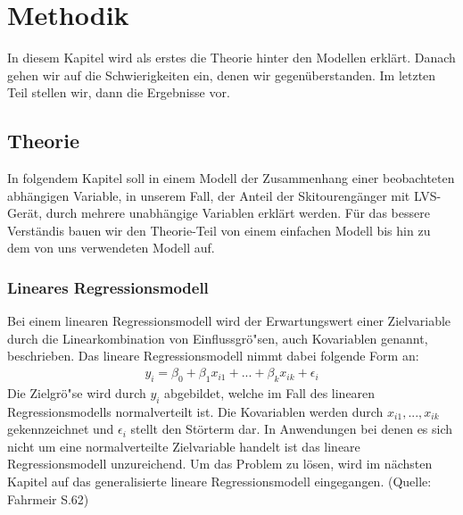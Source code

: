 \chapter{Methodik}
In diesem Kapitel wird als erstes die Theorie hinter den Modellen erklärt. Danach gehen wir auf die Schwierigkeiten ein, denen wir gegenüberstanden. Im letzten Teil stellen wir, dann die Ergebnisse vor.
\section{Theorie}
In folgendem Kapitel soll in einem Modell der Zusammenhang einer beobachteten abhängigen Variable, in unserem Fall, der Anteil der Skitourengänger mit LVS-Gerät, durch mehrere unabhängige Variablen erklärt werden.
Für das bessere Verständis bauen wir den Theorie-Teil von einem einfachen Modell bis hin zu dem von uns verwendeten Modell auf.
\subsection{Lineares Regressionsmodell}
Bei einem linearen Regressionsmodell wird der Erwartungswert einer Zielvariable durch die Linearkombination von Einflussgrö"sen, auch Kovariablen genannt, beschrieben. Das lineare Regressionsmodell nimmt dabei folgende Form an:
\begin{align}
y_{i}= \beta_{0}+\beta_{1}x_{i1}+...+\beta_{k}x_{ik}+\epsilon_{i}
\end{align}
Die Zielgrö"se wird durch $y_{i}$ abgebildet, welche im Fall des linearen Regressionsmodells normalverteilt ist. Die Kovariablen werden durch $x_{i1},...,x_{ik}$ gekennzeichnet und $\epsilon_{i}$ stellt den Störterm dar. In Anwendungen bei denen es sich nicht um eine normalverteilte Zielvariable handelt ist das lineare Regressionsmodell unzureichend. Um das Problem zu lösen, wird im nächsten Kapitel auf das generalisierte lineare Regressionsmodell eingegangen. (Quelle: Fahrmeir S.62)
